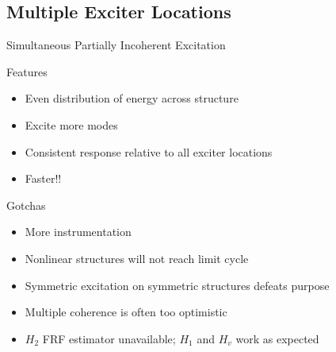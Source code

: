\documentclass[aspectratio=169,10pt]{beamer} \mode<presentation>
\begin{document}
\subsection{Multiple Exciter Locations}
\begin{frame}[t]{Simultaneous Partially Incoherent Excitation}
  \begin{block}{Features}
    \begin{itemize}[<+->]
      \item Even distribution of energy across structure
      \item Excite more modes
      \item Consistent response relative to all exciter locations
      \item Faster!!
    \end{itemize}
  \end{block}
  \begin{block}{Gotchas}
    \begin{itemize}[<+->]
      \item More instrumentation
      \item Nonlinear structures will not reach limit cycle
      \item Symmetric excitation on symmetric structures defeats purpose
      \item Multiple coherence is often too optimistic
      \item $H_2$ FRF estimator unavailable; $H_1$ and $H_v$ work as expected
    \end{itemize}
  \end{block}
\end{frame}
\end{document}
